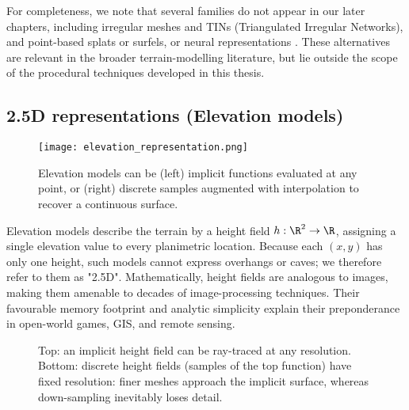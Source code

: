 For completeness, we note that several families do not appear in our later chapters, including irregular meshes and TINs (Triangulated Irregular Networks), and point-based splats or surfels, or neural representations \cite{Yang2005, Zhu2008, Arnone2021, Atas2022, Chen2024, Chen2025, Dai2024, Li2022}. These alternatives are relevant in the broader terrain-modelling literature, but lie outside the scope of the procedural techniques developed in this thesis.

\subsection{2.5D representations (Elevation models)}

\begin{figure}
  \texttt{[image: elevation\_representation.png]}
  \caption{Elevation models can be (left) implicit functions evaluated at any point, or (right) discrete samples augmented with interpolation to recover a continuous surface.}
  \label{fig:erosion-elevation-representation}
\end{figure}

Elevation models describe the terrain by a height field $h : \R^{2}  \to  \R$, assigning a single elevation value to every planimetric location. Because each $(x,y)$ has only one height, such models cannot express overhangs or caves; we therefore refer to them as "2.5D". Mathematically, height fields are analogous to images, making them amenable to decades of image-processing techniques. Their favourable memory footprint and analytic simplicity explain their preponderance in open-world games, GIS, and remote sensing.

\begin{figure}
    \caption{Top: an implicit height field can be ray-traced at any resolution. Bottom: discrete height fields (samples of the top
    function) have fixed resolution: finer meshes approach the implicit surface, whereas down-sampling inevitably loses detail.}
    \label{fig:sota-representations-heights-resolutions}
\end{figure}


